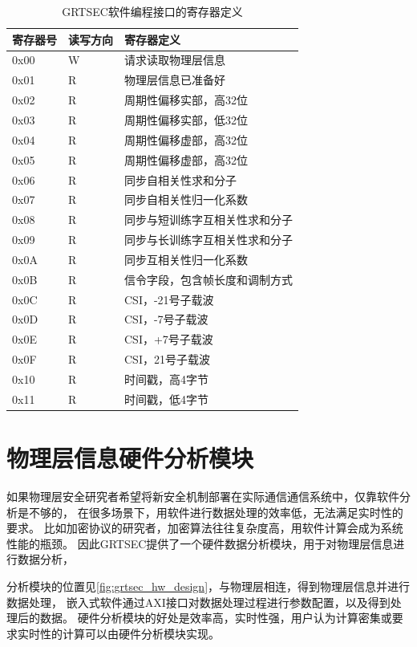	\begin{table}[!hbp]
	\centering
	\caption{GRTSEC软件编程接口的寄存器定义}
	\label{tab:grtsec_axi_reg_define}
		\begin{tabular}{|l|l|l|} \hline
		寄存器号 & 读写方向 & 寄存器定义 \\ \hline
		0x00 & W & 请求读取物理层信息 \\ \hline
		0x01 & R & 物理层信息已准备好 \\ \hline
		0x02 & R & 周期性偏移实部，高32位 \\ \hline
		0x03 & R & 周期性偏移实部，低32位 \\ \hline
		0x04 & R & 周期性偏移虚部，高32位 \\ \hline
		0x05 & R & 周期性偏移虚部，高32位 \\ \hline
		0x06 & R & 同步自相关性求和分子 \\ \hline
		0x07 & R & 同步自相关性归一化系数 \\ \hline
		0x08 & R & 同步与短训练字互相关性求和分子 \\ \hline
		0x09 & R & 同步与长训练字互相关性求和分子 \\ \hline
		0x0A & R & 同步互相关性归一化系数 \\ \hline
		0x0B & R & 信令字段，包含帧长度和调制方式 \\ \hline
		0x0C & R & CSI，-21号子载波 \\ \hline
		0x0D & R & CSI，-7号子载波 \\ \hline
		0x0E & R & CSI，+7号子载波 \\ \hline
		0x0F & R & CSI，21号子载波 \\ \hline
		0x10 & R & 时间戳，高4字节 \\ \hline
		0x11 & R & 时间戳，低4字节 \\ \hline
		\end{tabular}
	\end{table}

	\section{物理层信息硬件分析模块}\label{sec:grtsec_phyinfo_analyzer}
	如果物理层安全研究者希望将新安全机制部署在实际通信通信系统中，仅靠软件分析是不够的，
	在很多场景下，用软件进行数据处理的效率低，无法满足实时性的要求。
	比如加密协议的研究者，加密算法往往复杂度高，用软件计算会成为系统性能的瓶颈。
	因此GRTSEC提供了一个硬件数据分析模块，用于对物理层信息进行数据分析，

	分析模块的位置见\ref{fig:grtsec_hw_design}，与物理层相连，得到物理层信息并进行数据处理，
	嵌入式软件通过AXI接口对数据处理过程进行参数配置，以及得到处理后的数据。
	硬件分析模块的好处是效率高，实时性强，用户认为计算密集或要求实时性的计算可以由硬件分析模块实现。

